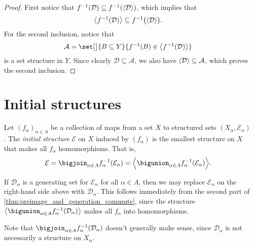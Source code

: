 \documentclass[article, a4paper, 11pt, oneside]{memoir}
\numberwithin{equation}{chapter}
\newcommand{\calE}{\mathcal{E}}
\newcommand{\calD}{\mathcal{D}}
\newcommand{\calA}{\mathcal{A}}
\DeclarePairedDelimiter{\gen}{\langle}{\rangle} %
\begin{document}
\begin{proof}
    First notice that $f^{-1}(\calD) \subseteq f^{-1}(\gen{\calD})$, which implies that
    \begin{equation*}
        \gen[\big]{f^{-1}(\calD)} \subseteq f^{-1}\bigl( \gen{\calD} \bigr).
    \end{equation*}
    For the second inclusion, notice that
    \begin{equation*}
        \calA = \set[\big]{B \subseteq Y}{f^{-1}(B) \in \gen[\big]{f^{-1}(\calD)}}
    \end{equation*}
    is a set structure in $Y$. Since clearly $\calD \subseteq \calA$, we also have $\gen{\calD} \subseteq \calA$, which proves the second inclusion.
\end{proof}


\section{Initial structures}

\begin{definition}
    Let $(f_\alpha)_{\alpha \in A}$ be a collection of maps from a set $X$ to structured sets $(X_\alpha, \calE_\alpha)$. The \emph{initial structure} $\calE$ on $X$ induced by $(f_\alpha)$ is the smallest structure on $X$ that makes all $f_\alpha$ homomorphisms. That is,
    \begin{equation*}
        \calE
            = \bigjoin_{\alpha \in A} f_\alpha^{-1}(\calE_\alpha)
            = \gen[\Big]{ \bigunion_{\alpha \in A} f_\alpha^{-1}(\calE_\alpha) }.
    \end{equation*}
\end{definition}

\begin{remark}
    \label{rem:initial_structure_generating_set}
    If $\calD_\alpha$ is a generating set for $\calE_\alpha$ for all $\alpha \in A$, then we may replace $\calE_\alpha$ on the right-hand side above with $\calD_\alpha$. This follows immediately from the second part of \cref{thm:preimage_and_generation_commute}, since the structure $\gen[\big]{ \bigunion_{\alpha \in A} f_\alpha^{-1}(\calD_\alpha) }$ makes all $f_\alpha$ into homomorphisms.

    Note that $\bigjoin_{\alpha \in A} f_\alpha^{-1}(\calD_\alpha)$ doesn't generally make sense, since $\calD_\alpha$ is not necessarily a structure on $X_\alpha$.
\end{remark}
\end{document}
